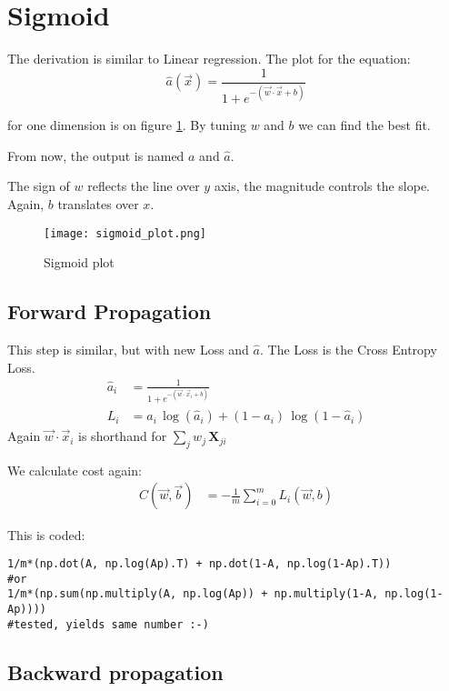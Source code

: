\section{Sigmoid}
The derivation is similar to Linear regression. The plot for the equation:
\[
  \hat{a}(\vec{x})= \frac{1}{1+e^{-(\vec{w}\cdot{}\vec{x}+b)}}
\]

for one dimension is on figure \ref{fig:sigmoid}. By tuning $w$ and $b$  we can find the best fit. 

From now, the output is named $a$ and $\hat{a}$.

The sign of $w$ reflects the line over $y$ axis, the magnitude controls the slope. Again, $b$ translates over $x$.

\begin{figure}[h]
 \centering
 \texttt{[image: sigmoid\_plot.png]}
  \caption{Sigmoid plot} \label{fig:sigmoid}
\end{figure}

\subsection{Forward Propagation}
This step is similar, but with new Loss and $\hat{a}$. 
The Loss is the Cross Entropy Loss.
\begin{align}
  \hat{a}_i &= \frac{1}{1+e^{-(\vec{w}\cdot \vec{x}_i + b)}}\\
  L_i &= a_i\,\log(\hat{a}_i) + (1-a_i)\,\log(1-\hat{a}_i)
\end{align}
Again $\vec{w}\cdot{}\vec{x}_i$ is shorthand for $\sum_{j} w_j\,\mathbf{X}_{ji}$

We calculate cost again:
\begin{align*}
  C(\vec{w}, \vec{b}) &= -\frac{1}{m}\sum_{i=0}^m L_i(\vec{w}, b)
\end{align*}

This is coded:
\begin{verbatim}
1/m*(np.dot(A, np.log(Ap).T) + np.dot(1-A, np.log(1-Ap).T))
#or
1/m*(np.sum(np.multiply(A, np.log(Ap)) + np.multiply(1-A, np.log(1-Ap))))
#tested, yields same number :-)
\end{verbatim}

\subsection{Backward propagation}

